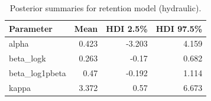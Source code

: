 \begin{table}
\caption{Posterior summaries for retention model (hydraulic).}
\label{tab:retention_hydraulic}
\begin{tabular}{lrrr}
\toprule
Parameter & Mean & HDI 2.5\% & HDI 97.5\% \\
\midrule
alpha & 0.423 & -3.203 & 4.159 \\
beta\_logk & 0.263 & -0.17 & 0.682 \\
beta\_log1pbeta & 0.47 & -0.192 & 1.114 \\
kappa & 3.372 & 0.57 & 6.673 \\
\bottomrule
\end{tabular}
\end{table}
